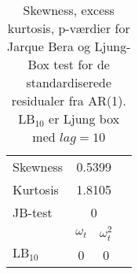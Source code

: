 \begin{table}
\center
\begin{tabular}{lccc}
\toprule
 Skewness & \multicolumn{2}{c}{0.5399} \\
 Kurtosis & \multicolumn{2}{c}{1.8105}\\
 JB-test & \multicolumn{2}{c}{0} \\
 \cmidrule{2-3}
 & $\omega_t$ &$ \omega_t^2$ \\
 $\text{LB}_{10}$ & 0 & 0 \\ \bottomrule
\end{tabular}
\caption{Skewness, excess kurtosis, p-værdier for Jarque Bera og Ljung-Box test for de standardiserede residualer fra AR(1). $\text{LB}_{10}$ er Ljung box med $lag = 10$  } \label{tab:ar_jb_lb}
\end{table}
